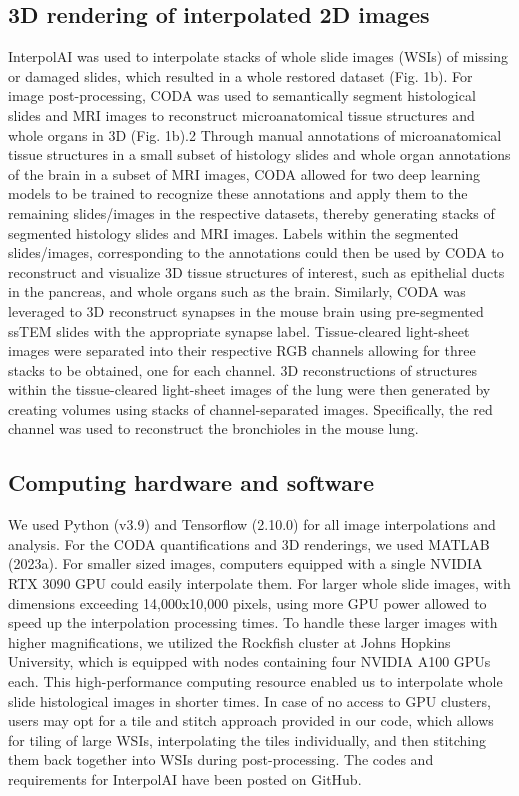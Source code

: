 \begin{refsection}
    \subsection{3D rendering of interpolated 2D images}
    InterpolAI was used to interpolate stacks of whole slide images (WSIs) of missing or damaged slides, which resulted in a whole restored dataset (Fig. 1b). For image post-processing, CODA was used to semantically segment histological slides and MRI images to reconstruct microanatomical tissue structures and whole organs in 3D (Fig. 1b).2 Through manual annotations of microanatomical tissue structures in a small subset of histology slides and whole organ annotations of the brain in a subset of MRI images, CODA allowed for two deep learning models to be trained to recognize these annotations and apply them to the remaining slides/images in the respective datasets, thereby generating stacks of segmented histology slides and MRI images. Labels within the segmented slides/images, corresponding to the annotations could then be used by CODA to reconstruct and visualize 3D tissue structures of interest, such as epithelial ducts in the pancreas, and whole organs such as the brain. Similarly, CODA was leveraged to 3D reconstruct synapses in the mouse brain using pre-segmented ssTEM slides with the appropriate synapse label. Tissue-cleared light-sheet images were separated into their respective RGB channels allowing for three stacks to be obtained, one for each channel. 3D reconstructions of structures within the tissue-cleared light-sheet images of the lung were then generated by creating volumes using stacks of channel-separated images. Specifically, the red channel was used to reconstruct the bronchioles in the mouse lung.
    
    \subsection{Computing hardware and software}
    We used Python (v3.9) and Tensorflow (2.10.0) for all image interpolations and analysis. For the CODA quantifications and 3D renderings, we used MATLAB (2023a).
    For smaller sized images, computers equipped with a single NVIDIA RTX 3090 GPU could easily interpolate them. For larger whole slide images, with dimensions exceeding 14,000x10,000 pixels, using more GPU power allowed to speed up the interpolation processing times. To handle these larger images with higher magnifications, we utilized the Rockfish cluster at Johns Hopkins University, which is equipped with nodes containing four NVIDIA A100 GPUs each. This high-performance computing resource enabled us to interpolate whole slide histological images in shorter times. In case of no access to GPU clusters, users may opt for a tile and stitch approach provided in our code, which allows for tiling of large WSIs, interpolating the tiles individually, and then stitching them back together into WSIs during post-processing. The codes and requirements for InterpolAI have been posted on GitHub.  
    
    \clearpage
    \printbibliography[heading=subbibliography, title={References}]
\end{refsection}
